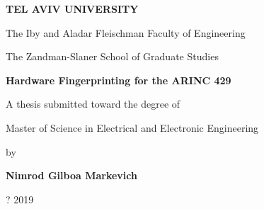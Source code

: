 \begin{titlepage}
\begin{center}
  \vspace*{1cm}
  
  \Large
  \textbf{TEL AVIV UNIVERSITY}
  
  \normalsize
  The Iby and Aladar Fleischman Faculty of Engineering
  
  The Zandman-Slaner School of Graduate Studies
  
  \vspace{0.5cm}
  \LARGE
  \textbf{Hardware Fingerprinting for the ARINC 429}
  
  \vspace{0.5cm}
  
  \vspace{1cm}
  \normalsize
   A thesis submitted toward the degree of
   
   Master of Science in Electrical and Electronic Engineering
   
   \vspace{0.5cm}
   by
   
  \Large
  \textbf{Nimrod Gilboa Markevich}
  
  \vspace{0.5cm}
  \large
  ? 2019
\end{center}
\end{titlepage}
